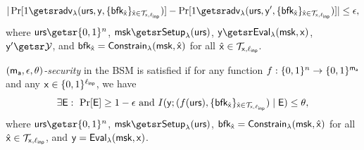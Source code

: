 \begin{definition}
\[
	|\Pr[1\getsr\adv(\urs,\image, \{\bprfsk_{\fixstring}\}_{\fixstring\in\fixstringset})]-\Pr[1\getsr \adv(\urs,\image^{\prime}, \{\bprfsk_{\fixstring}\}_{\fixstring\in\fixstringset})]| \leq \epsilon,
\]
where $\urs \getsr \bin^{n}$, $\bprfmsk \getsr \bprfsetup(\urs)$, $\image \getsr \bprfeval(\bprfmsk, \preimage)$, $\image^{\prime} \getsr \bprfy$, and $\mathsf{bfk}_{\hat{\mathsf{x}}} = \mathsf{Constrain}_{\lambda}(\mathsf{msk}, \hat{\mathsf{x}})$ for all $\hat{\mathsf{x}} \in \mathcal{T}_{\mathsf{x}, \ell_{\mathsf{inp}}}$.

\emph{$(\mathsf{m_a}, \epsilon, \theta)$-security} in the BSM is satisfied if for any function $f : \{0, 1\}^{n} \rightarrow \{0, 1\}^{\mathsf{m_a}}$ and any $\mathsf{x} \in \{0, 1\}^{\ell_{\mathsf{inp}}}$, we have
	$$\exists \mathsf{E}:\ \Pr[\mathsf{E}]\geq 1-\epsilon\ \mbox{and}\ I(\mathsf{y};(f(\mathsf{urs}), \{\mathsf{bfk}_{\hat{\mathsf{x}}}\}_{\hat{\mathsf{x}}\in\mathcal{T}_{\mathsf{x}, \ell_{\mathsf{inp}}}})\mid\mathsf{E})\leq \theta,$$
	where $\urs \getsr \bin^{n}$, $\bprfmsk \getsr \bprfsetup(\urs)$, $\mathsf{bfk}_{\hat{\mathsf{x}}} = \mathsf{Constrain}_{\lambda}(\mathsf{msk}, \hat{\mathsf{x}})$ for all $\hat{\mathsf{x}} \in \mathcal{T}_{\mathsf{x}, \ell_{\mathsf{inp}}}$, and $\mathsf{y} = \mathsf{Eval}_{\lambda}(\mathsf{msk}, \mathsf{x})$.
\end{definition}
